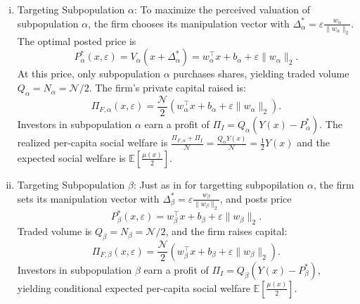 \begin{enumerate}[(i)]
\item Targeting Subpopulation $\alpha$:
  To maximize the perceived valuation of subpopulation $\alpha$, the firm chooses its manipulation vector with $\Delta_\alpha^* = \varepsilon \frac{w_\alpha}{\|w_\alpha\|_2}$. The optimal posted price is
  \begin{equation}
  P_\alpha^*(x, \varepsilon) = V_\alpha(x + \Delta_\alpha^*) = w_\alpha^\top x + b_\alpha + \varepsilon \|w_\alpha\|_2.
  \end{equation}
  At this price, only subpopulation $\alpha$ purchases shares, yielding traded volume $Q_\alpha = N_\alpha = \mathcal{N}/2$. The firm's private capital raised is:
  \begin{equation}
  \Pi_{F,\alpha}(x, \varepsilon) = \frac{\mathcal{N}}{2}\left(w_\alpha^\top x + b_\alpha + \varepsilon \|w_\alpha\|_2\right).
  \end{equation}
  Investors in subpopulation $\alpha$ earn a profit of $\Pi_{I} = Q_\alpha(Y(x) - P_\alpha^*)$. The realized per-capita social welfare is $\frac{\Pi_{F,\alpha} + \Pi_{I}}{\mathcal{N}} = \frac{Q_\alpha Y(x)}{\mathcal{N}} = \frac{1}{2}Y(x)$ and the expected social welfare is $\mathbb{E}[\frac{\mu(x)}{2}]$.
  
\item Targeting Subpopulation $\beta$: Just as in for targetting subpopilation $\alpha$, the firm sets its manipulation vector with $\Delta_\beta^* = \varepsilon \frac{w_\beta}{\|w_\beta\|_2}$, and posts price
  \begin{equation}
  P_\beta^*(x, \varepsilon) = w_\beta^\top x + b_\beta + \varepsilon \|w_\beta\|_2.
  \end{equation}
  Traded volume is $Q_\beta = N_\beta = \mathcal{N}/2$, and the firm raises capital:
  \begin{equation}
  \Pi_{F,\beta}(x, \varepsilon) = \frac{\mathcal{N}}{2}\left(w_\beta^\top x + b_\beta + \varepsilon \|w_\beta\|_2\right).
  \end{equation}
  Investors in subpopulation $\beta$ earn a profit of $\Pi_{I} = Q_\beta(Y(x) - P_\beta^*)$, yielding conditional expected per-capita social welfare $\mathbb{E}[\frac{\mu(x)}{2}]$.
  

\end{enumerate}
